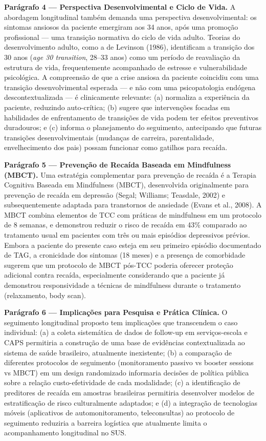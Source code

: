 \documentclass[12pt,a4paper]{article}
\begin{document}
\textbf{Parágrafo 4 — Perspectiva Desenvolvimental e Ciclo de Vida.} A abordagem longitudinal também demanda uma perspectiva desenvolvimental: os sintomas ansiosos da paciente emergiram aos 34 anos, após uma promoção profissional --- uma transição normativa do ciclo de vida adulto. Teorias do desenvolvimento adulto, como a de Levinson (1986), identificam a transição dos 30 anos (\textit{age 30 transition}, 28--33 anos) como um período de reavaliação da estrutura de vida, frequentemente acompanhado de estresse e vulnerabilidade psicológica. A compreensão de que a crise ansiosa da paciente coincidiu com uma transição desenvolvimental esperada --- e não com uma psicopatologia endógena descontextualizada --- é clinicamente relevante: (a) normaliza a experiência da paciente, reduzindo auto-crítica; (b) sugere que intervenções focadas em habilidades de enfrentamento de transições de vida podem ter efeitos preventivos duradouros; e (c) informa o planejamento do seguimento, antecipando que futuras transições desenvolvimentais (mudanças de carreira, parentalidade, envelhecimento dos pais) possam funcionar como gatilhos para recaída.

\textbf{Parágrafo 5 — Prevenção de Recaída Baseada em Mindfulness (MBCT).} Uma estratégia complementar para prevenção de recaída é a Terapia Cognitiva Baseada em Mindfulness (MBCT), desenvolvida originalmente para prevenção de recaída em depressão (Segal; Williams; Teasdale, 2002) e subsequentemente adaptada para transtornos de ansiedade (Evans et al., 2008). A MBCT combina elementos de TCC com práticas de mindfulness em um protocolo de 8 semanas, e demonstrou reduzir o risco de recaída em 43\% comparado ao tratamento usual em pacientes com três ou mais episódios depressivos prévios. Embora a paciente do presente caso esteja em seu primeiro episódio documentado de TAG, a cronicidade dos sintomas (18 meses) e a presença de comorbidade sugerem que um protocolo de MBCT pós-TCC poderia oferecer proteção adicional contra recaída, especialmente considerando que a paciente já demonstrou responsividade a técnicas de mindfulness durante o tratamento (relaxamento, body scan).

\textbf{Parágrafo 6 — Implicações para Pesquisa e Prática Clínica.} O seguimento longitudinal proposto tem implicações que transcendem o caso individual: (a) a coleta sistemática de dados de follow-up em serviços-escola e CAPS permitiria a construção de uma base de evidências contextualizada ao sistema de saúde brasileiro, atualmente inexistente; (b) a comparação de diferentes protocolos de seguimento (monitoramento passivo vs booster sessions vs MBCT) em um design randomizado informaria decisões de política pública sobre a relação custo-efetividade de cada modalidade; (c) a identificação de preditores de recaída em amostras brasileiras permitiria desenvolver modelos de estratificação de risco culturalmente adaptados; e (d) a integração de tecnologias móveis (aplicativos de automonitoramento, teleconsultas) ao protocolo de seguimento reduziria a barreira logística que atualmente limita o acompanhamento longitudinal no SUS.
\end{document}
